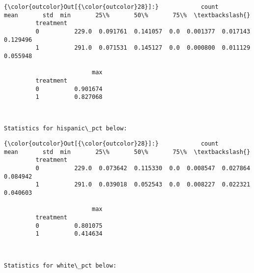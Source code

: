 \documentclass[11pt]{article}
\begin{document}
\begin{Verbatim}[commandchars=\\\{\}]
{\color{outcolor}Out[{\color{outcolor}28}]:}            count      mean       std  min       25\%       50\%       75\%  \textbackslash{}
         treatment                                                                 
         0          229.0  0.091761  0.141057  0.0  0.001377  0.017143  0.129496   
         1          291.0  0.071531  0.145127  0.0  0.000800  0.011129  0.055948   
         
                         max  
         treatment            
         0          0.901674  
         1          0.827068  
\end{Verbatim}
            
    \begin{center}
    \end{center}
    { \hspace*{\fill} \\}
    
    \begin{Verbatim}[commandchars=\\\{\}]
Statistics for hispanic\_pct below:

    \end{Verbatim}

\begin{Verbatim}[commandchars=\\\{\}]
{\color{outcolor}Out[{\color{outcolor}28}]:}            count      mean       std  min       25\%       50\%       75\%  \textbackslash{}
         treatment                                                                 
         0          229.0  0.073642  0.115330  0.0  0.008547  0.027864  0.084942   
         1          291.0  0.039018  0.052543  0.0  0.008227  0.022321  0.040603   
         
                         max  
         treatment            
         0          0.801075  
         1          0.414634  
\end{Verbatim}
            
    \begin{center}
    \end{center}
    { \hspace*{\fill} \\}
    
    \begin{Verbatim}[commandchars=\\\{\}]
Statistics for white\_pct below:

    \end{Verbatim}
\end{document}
